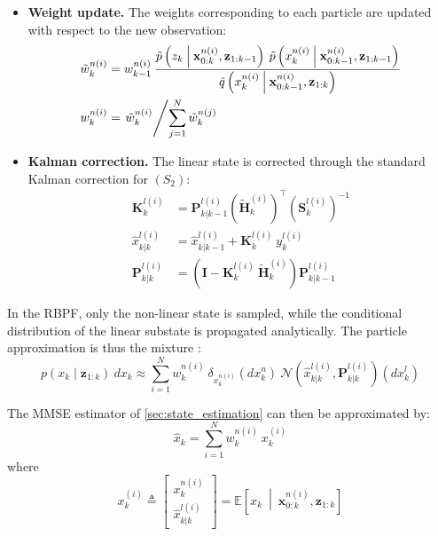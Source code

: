 \begin{itemize}
\begin{align}
		y_k^{l(i)}&=z_k-\left(\tilde{\mathbf{H}}_k^{(i)}\:\hat{x}_{k|k-1}^{l(i)}+h_k\left(x_k^{n(i)}\right)\right)\\
		\mathbf{S}_k^{l(i)}&=\tilde{\mathbf{H}}_k^{(i)}\:\mathbf{P}_{k|k-1}^{l(i)}\left(\tilde{\mathbf{H}}_k^{(i)}\right)^\top+\mathbf{R}_k\label{eq:RBPF_prediction_fin}
	\end{align}
	\item\textbf{Weight update.} The weights corresponding to each particle are updated with respect to the new observation:
	\begin{align}
		\tilde{w}_k^{n(i)}&=w_{k-1}^{n(i)}\:\dfrac{\tilde{p}\left(z_k\:\middle|\:\mathbf{x}_{0:k}^{n(i)},\mathbf{z}_{1:k-1}\right)\:\tilde{p}\left(x_k^{n(i)}\:\middle|\:\mathbf{x}_{0:k-1}^{n(i)},\mathbf{z}_{1:k-1}\right)}{\tilde{q}\left(x_k^{n(i)}\:\middle|\:\mathbf{x}_{0:k-1}^{n(i)},\mathbf{z}_{1:k}\right)}\label{eq:RBPF_update_debut}\\
		w_k^{n(i)}&=\left.\tilde{w}_k^{n(i)}\middle/\sum_{j=1}^N\tilde{w}_k^{n(j)}\right.\label{eq:RBPF_update_fin}
	\end{align}
	\item\textbf{Kalman correction.} The linear state is corrected through the standard Kalman correction for $(S_2)$:
	\begin{align}
		\mathbf{K}_k^{l(i)}&=\mathbf{P}_{k|k-1}^{l(i)}\left(\tilde{\mathbf{H}}_k^{(i)}\right)^\top\left(\mathbf{S}_k^{l(i)}\right)^{-1}\label{eq:RBPF_correction_debut}\\
		\hat{x}_{k|k}^{l(i)}&=\hat{x}_{k|k-1}^{l(i)}+\mathbf{K}_k^{l(i)}\:y_k^{l(i)}\\
		\mathbf{P}_{k|k}^{l(i)}&=\left(\mathbf{I}-\mathbf{K}_k^{l(i)}\:\tilde{\mathbf{H}}_k^{(i)}\right)\mathbf{P}_{k|k-1}^{l(i)}\label{eq:RBPF_correction_fin}
	\end{align}
\end{itemize}

In the RBPF, only the non-linear state is sampled, while the conditional distribution of the linear substate is propagated analytically. The particle approximation is thus the mixture \cite{bib:mixture-Kalman}:
\begin{equation}
	p(x_k\mid\mathbf{z}_{1:k})\:dx_k\approx\sum_{i=1}^Nw_k^{n(i)}\:\delta_{x_k^{n(i)}}\left(dx_k^n\right)\:\mathcal{N}\left(\hat{x}_{k|k}^{l(i)},\mathbf{P}_{k|k}^{l(i)}\right)\left(dx_k^l\right)
\end{equation}

The MMSE estimator of \cref{sec:state_estimation} can then be approximated by:
\begin{equation}
	\hat{x}_k=\sum_{i=1}^Nw_k^{n(i)}\:x_k^{(i)}
\end{equation}
where
\begin{equation}
	x_k^{(i)}\triangleq\begin{bmatrix}x_k^{n(i)}\\\hat{x}_{k|k}^{l(i)}\end{bmatrix}=\mathbb{E}\left[x_k\:\middle|\:\mathbf{x}_{0:k}^{n(i)},\mathbf{z}_{1:k}\right]
\end{equation}

